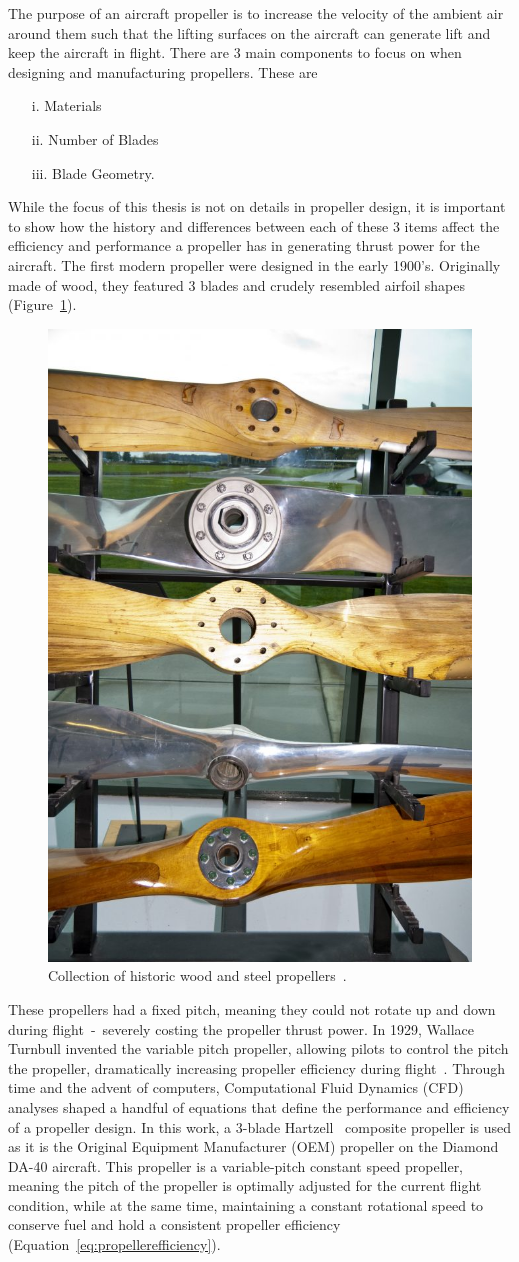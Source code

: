 \documentclass[12pt]{report}
\begin{document}
The purpose of an aircraft propeller is to increase the velocity of the ambient air around them such that the lifting surfaces on the aircraft can generate lift and keep the aircraft in flight. There are 3 main components to focus on when designing and manufacturing propellers. These are
\begin{itemize}
  \item[i.] Materials
  \item[ii.] Number of Blades
  \item[iii.] Blade Geometry.
\end{itemize}
While the focus of this thesis is not on details in propeller design, it is important to show how the history and differences between each of these 3 items affect the efficiency and performance a propeller has in generating thrust power for the aircraft. The first modern propeller were designed in the early 1900's. Originally made of wood, they featured 3 blades and crudely resembled airfoil shapes (Figure~\ref{fig:woodprops}).

\begin{figure}[!ht]\label{fig:woodprops}
  \centering
  \includegraphics[width=0.3\linewidth]{Figures/woodProps.jpg}
  \caption{Collection of historic wood and steel propellers~\cite{ianHowIdentifyHistoric2016}.}
\end{figure}

These propellers had a fixed pitch, meaning they could not rotate up and down during flight~-~severely costing the propeller thrust power. In 1929, Wallace Turnbull invented the variable pitch propeller, allowing pilots to control the pitch the propeller, dramatically increasing propeller efficiency during flight~\cite{ianShortHistoryAircraft2018}. Through time and the advent of computers, Computational Fluid Dynamics (CFD) analyses shaped a handful of equations that define the performance and efficiency of a propeller design. In this work, a 3-blade Hartzell~\cite{HartzellPropellerInc} composite propeller is used as it is the Original Equipment Manufacturer (OEM) propeller on the Diamond DA-40 aircraft. This propeller is a variable-pitch constant speed propeller, meaning the pitch of the propeller is optimally adjusted for the current flight condition, while at the same time, maintaining a constant rotational speed to conserve fuel and hold a consistent propeller efficiency (Equation~\ref{eq:propellerefficiency}).
\end{document}
